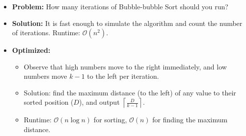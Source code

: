 \begin{frame}
    \frametitle{\problemtitle}
    \begin{itemize}
        \item<+-> \textbf{Problem:} How many iterations of Bubble-bubble Sort should you run?
        \item<+-> \textbf{Solution:} It is fast enough to simulate the algorithm and count the number of iterations.
                    Runtime: $\mathcal O(n^2)$.
        \item<+-> \textbf{Optimized:}
        \begin{itemize}
            \item Observe that high numbers move to the right immediately,
                    and low numbers move $k-1$ to the left per iteration.
            \item Solution: find the maximum distance (to the left) of any value to their sorted position ($D$),
                    and output $\displaystyle\left\lceil \frac{D}{k-1} \right\rceil$.
            \item Runtime: $\mathcal O(n \log n)$ for sorting, $\mathcal O(n)$ for finding the maximum distance.
        \end{itemize}
    \end{itemize}
    \solvestats
\end{frame}
